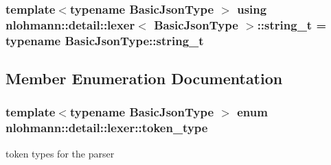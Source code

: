 \subsubsection[{\texorpdfstring{string\+\_\+t}{string_t}}]{\setlength{\rightskip}{0pt plus 5cm}template$<$typename Basic\+Json\+Type $>$ using {\bf nlohmann\+::detail\+::lexer}$<$ Basic\+Json\+Type $>$\+::{\bf string\+\_\+t} =  typename Basic\+Json\+Type\+::string\+\_\+t\hspace{0.3cm}{\ttfamily [private]}}\hypertarget{classnlohmann_1_1detail_1_1lexer_ab63d35c658887592a4b09ad26eb4c795}{}\label{classnlohmann_1_1detail_1_1lexer_ab63d35c658887592a4b09ad26eb4c795}


\subsection{Member Enumeration Documentation}
\subsubsection[{\texorpdfstring{token\+\_\+type}{token_type}}]{\setlength{\rightskip}{0pt plus 5cm}template$<$typename Basic\+Json\+Type $>$ enum {\bf nlohmann\+::detail\+::lexer\+::token\+\_\+type}\hspace{0.3cm}{\ttfamily [strong]}}\hypertarget{classnlohmann_1_1detail_1_1lexer_a3f313cdbe187cababfc5e06f0b69b098}{}\label{classnlohmann_1_1detail_1_1lexer_a3f313cdbe187cababfc5e06f0b69b098}


token types for the parser 

